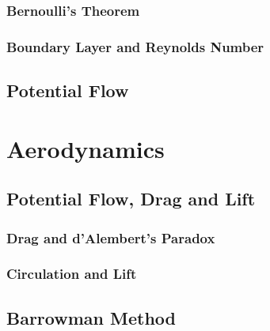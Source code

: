 \documentclass[uplatex,dvipdfmx,a4paper,11pt]{report}
\numberwithin{equation}{chapter}
\begin{document}
\subsection{Bernoulli's Theorem}

\subsection{Boundary Layer and Reynolds Number}

\section{Potential Flow}


\chapter{Aerodynamics}

\section{Potential Flow, Drag and Lift}
\subsection{Drag and d'Alembert's Paradox}

\subsection{Circulation and Lift}

\section{Barrowman Method}
\end{document}
